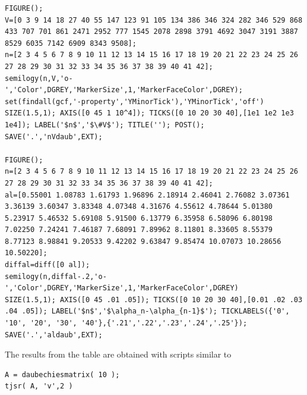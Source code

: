 {\small%
\begin{lstlisting}
FIGURE(); 
V=[0 3 9 14 18 27 40 55 147 123 91 105 134 386 346 324 282 346 529 868 433 707 701 861 2471 2952 777 1545 2078 2898 3791 4692 3047 3191 3887 8529 6035 7142 6909 8343 9508];
n=[2 3 4 5 6 7 8 9 10 11 12 13 14 15 16 17 18 19 20 21 22 23 24 25 26 27 28 29 30 31 32 33 34 35 36 37 38 39 40 41 42];
semilogy(n,V,'o-','Color',DGREY,'MarkerSize',1,'MarkerFaceColor',DGREY);
set(findall(gcf,'-property','YMinorTick'),'YMinorTick','off')
SIZE(1.5,1); AXIS([0 45 1 10^4]); TICKS([0 10 20 30 40],[1e1 1e2 1e3 1e4]); LABEL('$n$','$\#V$'); TITLE(''); POST();
SAVE('.','nVdaub',EXT);

FIGURE();
n=[2 3 4 5 6 7 8 9 10 11 12 13 14 15 16 17 18 19 20 21 22 23 24 25 26 27 28 29 30 31 32 33 34 35 36 37 38 39 40 41 42];
al=[0.55001 1.08783 1.61793 1.96896 2.18914 2.46041 2.76082 3.07361 3.36139 3.60347 3.83348 4.07348 4.31676 4.55612 4.78644 5.01380 5.23917 5.46532 5.69108 5.91500 6.13779 6.35958 6.58096 6.80198 7.02250 7.24241 7.46187 7.68091 7.89962 8.11801 8.33605 8.55379 8.77123 8.98841 9.20533 9.42202 9.63847 9.85474 10.07073 10.28656 10.50220];
diffal=diff([0 al]);
semilogy(n,diffal-.2,'o-','Color',DGREY,'MarkerSize',1,'MarkerFaceColor',DGREY)
SIZE(1.5,1); AXIS([0 45 .01 .05]); TICKS([0 10 20 30 40],[0.01 .02 .03 .04 .05]); LABEL('$n$','$\alpha_n-\alpha_{n-1}$'); TICKLABELS({'0', '10', '20', '30', '40'},{'.21','.22','.23','.24','.25'});
SAVE('.','aldaub',EXT);
\end{lstlisting}%
}

The results from the table are obtained with scripts similar to
{\small%
\begin{lstlisting}
A = daubechiesmatrix( 10 );
tjsr( A, 'v',2 )
\end{lstlisting}%
}